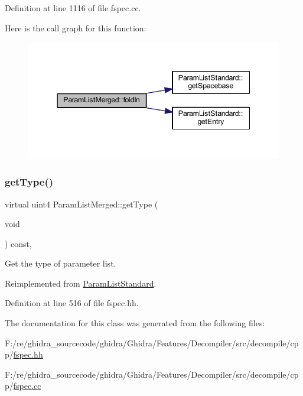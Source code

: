 Definition at line 1116 of file fspec.\+cc.

Here is the call graph for this function\+:
\nopagebreak
\begin{figure}[H]
\begin{center}
\leavevmode
\includegraphics[width=344pt]{class_param_list_merged_a2e1b347dc631d5efdc049ec29d73b30f_cgraph}
\end{center}
\end{figure}
\mbox{\label{class_param_list_merged_a39f0621f7d34c4aa4d591fd51b2ab5fe}} 
\subsubsection{\texorpdfstring{getType()}{getType()}}
{\footnotesize\ttfamily virtual uint4 Param\+List\+Merged\+::get\+Type (\begin{DoxyParamCaption}\item[{void}]{ }\end{DoxyParamCaption}) const\hspace{0.3cm}{\ttfamily [inline]}, {\ttfamily [virtual]}}



Get the type of parameter list. 



Reimplemented from \mbox{\hyperlink{class_param_list_standard_a37193293ffb24b1206944e35ef64973c}{Param\+List\+Standard}}.



Definition at line 516 of file fspec.\+hh.



The documentation for this class was generated from the following files\+:\begin{DoxyCompactItemize}
\item 
F\+:/re/ghidra\+\_\+sourcecode/ghidra/\+Ghidra/\+Features/\+Decompiler/src/decompile/cpp/\mbox{\hyperlink{fspec_8hh}{fspec.\+hh}}\item 
F\+:/re/ghidra\+\_\+sourcecode/ghidra/\+Ghidra/\+Features/\+Decompiler/src/decompile/cpp/\mbox{\hyperlink{fspec_8cc}{fspec.\+cc}}\end{DoxyCompactItemize}
